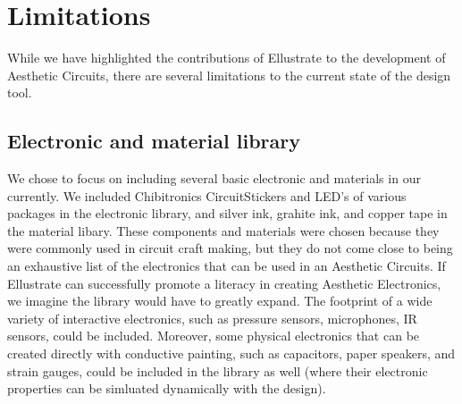 \documentclass{sigchi}
\begin{document}
    

\section{Limitations}
While we have highlighted the contributions of Ellustrate to the development of Aesthetic Circuits, there are several limitations to the current state of the design tool. 


\subsection{Electronic and material library}
We chose to focus on including several basic electronic and materials in our currently. We included Chibitronics CircuitStickers and LED's of various packages in the electronic library, and silver ink, grahite ink, and copper tape in the material libary. These components and materials were chosen because they were commonly used in circuit craft making, but they do not come close to being an exhaustive list of the electronics that can be used in an Aesthetic Circuits. If Ellustrate can successfully promote a literacy in creating Aesthetic Electronics, we imagine the library would have to greatly expand. The footprint of a wide variety of interactive electronics, such as pressure sensors, microphones, IR sensors, could be included. Moreover, some physical electronics that can be created directly with conductive painting, such as capacitors, paper speakers, and strain gauges, could be included in the library as well (where their electronic properties can be simluated dynamically with the design). 
\end{document}
